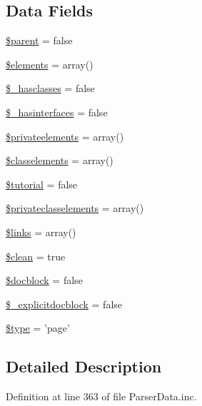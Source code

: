 \subsection*{\-Data \-Fields}
\begin{DoxyCompactItemize}
\item 
\hyperlink{classparser_data_a4e2313a4b35b72a06ac45fd38960f677}{\$parent} = false
\item 
\hyperlink{classparser_data_ad18dd8fbe31b294e2bc4711dcde4548d}{\$elements} = array()
\item 
\hyperlink{classparser_data_a85704b1e3e7a2a2dfa5afbfbbe7df427}{\$\-\_\-hasclasses} = false
\item 
\hyperlink{classparser_data_a746437a3e5ef01d41a1a64ba01bcc8a4}{\$\-\_\-hasinterfaces} = false
\item 
\hyperlink{classparser_data_acefdabe0fd6610bce2e0863823e3a799}{\$privateelements} = array()
\item 
\hyperlink{classparser_data_a16a5f43c92515df612ca69fdfa7fe1fa}{\$classelements} = array()
\item 
\hyperlink{classparser_data_a78498c66c97cfd4c420a7f2908b65f24}{\$tutorial} = false
\item 
\hyperlink{classparser_data_a4788546834382e747a7b958764510268}{\$privateclasselements} = array()
\item 
\hyperlink{classparser_data_a4ca8be3ff3cf95aa3af546449c1f1bec}{\$links} = array()
\item 
\hyperlink{classparser_data_a65f6a20f0163f9eb687b6285bd140789}{\$clean} = true
\item 
\hyperlink{classparser_data_abf700ed3060f06f15a7a01354dfd4087}{\$docblock} = false
\item 
\hyperlink{classparser_data_a7f2daede413e069ea85cf11713da32c0}{\$\-\_\-explicitdocblock} = false
\item 
\hyperlink{classparser_data_a9a4a6fba2208984cabb3afacadf33919}{\$type} = 'page'
\end{DoxyCompactItemize}


\subsection{\-Detailed \-Description}


\-Definition at line 363 of file \-Parser\-Data.\-inc.




